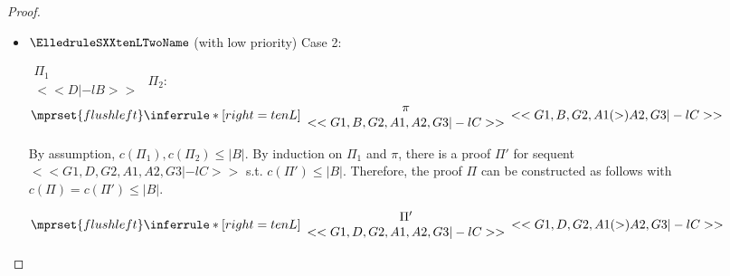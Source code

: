 \begin{proof}
\begin{enumerate}
\begin{itemize}
  \item $\ElledruleSXXtenLTwoName$ (with low priority) Case 2:
      \begin{center}
        \scriptsize
        \begin{math}
          \begin{array}{c}
            \Pi_1 \\
            {<<D |-l B>>}
          \end{array}
        \end{math}
        \qquad\qquad
        $\Pi_2$:
        \begin{math}
          $$\mprset{flushleft}
          \inferrule* [right={\tiny tenL}] {
            {
              \begin{array}{c}
                \pi \\
                {<<G1, B, G2, A1, A2, G3 |-l C>>}
              \end{array}
            }
          }{<<G1, B, G2, A1 (>) A2, G3 |-l C>>}
        \end{math}
      \end{center}
      By assumption, $c(\Pi_1),c(\Pi_2)\leq |B|$. By induction on $\Pi_1$ and $\pi$, there is
      a proof $\Pi'$ for sequent $<<G1, D, G2, A1, A2, G3 |-l C>>$ s.t. $c(\Pi') \leq |B|$.
      Therefore, the proof $\Pi$ can be constructed as follows with
      $c(\Pi) = c(\Pi') \leq |B|$.
      \begin{center}
        \scriptsize
        \begin{math}
          $$\mprset{flushleft}
          \inferrule* [right={\tiny tenL}] {
            {
              \begin{array}{c}
                \Pi' \\
                {<<G1, D, G2, A1, A2, G3 |-l C>>}
              \end{array}
            }
          }{<<G1, D, G2, A1 (>) A2, G3 |-l C>>}
        \end{math}
      \end{center}


\end{itemize}
\end{enumerate}
\end{proof}
